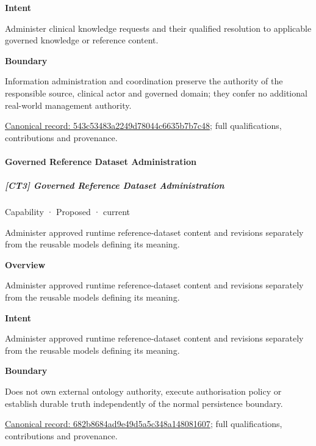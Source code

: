 \textbf{Intent}



Administer clinical knowledge requests and their qualified resolution to applicable governed knowledge or reference content.



\textbf{Boundary}



Information administration and coordination preserve the authority of the responsible source, clinical actor and governed domain; they confer no additional real-world management authority.


{\footnotesize \href{../../../../continuum/strategy/capability/543c53483a2249d78044c6635b7b7c48.md}{Canonical record: 543c53483a2249d78044c6635b7b7c48}; full qualifications, contributions and provenance.}\par
\paragraph{Governed Reference Dataset Administration}

\subparagraph{[CT3] Governed Reference Dataset Administration}

\label{element:682b8684ad9e49d5a5c348a148081607}
{\small Capability · Proposed · current}\par

Administer approved runtime reference-dataset content and revisions separately from the reusable models defining its meaning.



\textbf{Overview}



Administer approved runtime reference-dataset content and revisions separately from the reusable models defining its meaning.



\textbf{Intent}



Administer approved runtime reference-dataset content and revisions separately from the reusable models defining its meaning.



\textbf{Boundary}



Does not own external ontology authority, execute authorisation policy or establish durable truth independently of the normal persistence boundary.


{\footnotesize \href{../../../../continuum/strategy/capability/682b8684ad9e49d5a5c348a148081607.md}{Canonical record: 682b8684ad9e49d5a5c348a148081607}; full qualifications, contributions and provenance.}\par
